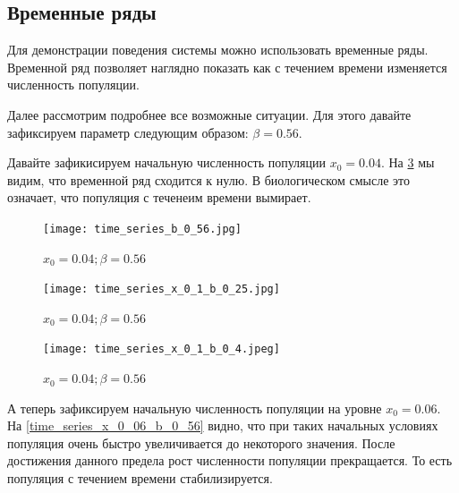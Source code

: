     \subsection{Временные ряды}

        Для демонстрации поведения системы можно использовать временные ряды. Временной ряд позволяет наглядно показать как с течением времени изменяется численность популяции.

        Далее рассмотрим подробнее все возможные ситуации. Для этого давайте зафиксируем параметр следующим образом: \(\beta = 0.56\). 

        Давайте зафикисируем начальную численность популяции \(x_0 = 0.04\). На \ref{time_series_x_0_04_b_0_56} мы видим, что временной ряд сходится к нулю. В биологическом смысле это означает, что популяция с теченеим времени вымирает.
    
        \begin{figure}
            \centering
            \texttt{[image: time\_series\_b\_0\_56.jpg]}

            \captionsetup{justification=centering}
            \caption{\(x_0 = 0.04; \beta = 0.56\)}
            \label{time_series_x_0_04_b_0_56}
        \end{figure}
    
        \begin{figure}
            \centering
            \texttt{[image: time\_series\_x\_0\_1\_b\_0\_25.jpg]}

            \captionsetup{justification=centering}
            \caption{\(x_0 = 0.04; \beta = 0.56\)}
            \label{time_series_x_0_04_b_0_56}
        \end{figure}
    
        \begin{figure}
            \centering
            \texttt{[image: time\_series\_x\_0\_1\_b\_0\_4.jpeg]}

            \captionsetup{justification=centering}
            \caption{\(x_0 = 0.04; \beta = 0.56\)}
            \label{time_series_x_0_04_b_0_56}
        \end{figure}

        А теперь зафиксируем начальную численность популяции на уровне \(x_0 = 0.06\). На \ref{time_series_x_0_06_b_0_56} видно, что при таких начальных условиях популяция очень быстро увеличивается до некоторого значения. После достижения данного предела рост численности популяции прекращается. То есть популяция с течением времени стабилизируется.

